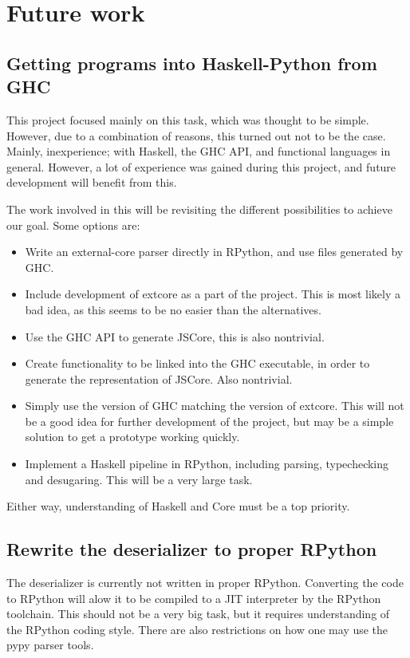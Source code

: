 \section{Future work}

\subsection{Getting programs into Haskell-Python from GHC}

This project focused mainly on this task, which was thought to be simple.
However, due to a combination of reasons, this turned out not to be the case.
Mainly, inexperience; with Haskell, the GHC API, and functional languages in 
general. However, a lot of experience was gained during this project, and
future development will benefit from this.

The work involved in this will be revisiting the different possibilities to
achieve our goal. Some options are:

\begin{itemize}
\item Write an external-core parser directly in RPython, and use files generated by GHC.
\item Include development of extcore as a part of the project. This is most likely a bad
idea, as this seems to be no easier than the alternatives.
\item Use the GHC API to generate JSCore, this is also nontrivial.
\item Create functionality to be linked into the GHC executable, in order to generate the
representation of JSCore. Also nontrivial.
\item Simply use the version of GHC matching the version of extcore. This will not be
a good idea for further development of the project, but may be a simple solution to get
a prototype working quickly.
\item Implement a Haskell pipeline in RPython, including parsing, typechecking and desugaring.
This will be a very large task.
\end{itemize}

Either way, understanding of Haskell and Core must be a top priority.

\subsection{Rewrite the deserializer to proper RPython}

The deserializer is currently not written in proper RPython. 
Converting the code to RPython will alow it to be compiled to a JIT interpreter by
the RPython toolchain. This should not be a very big task, but it requires understanding
of the RPython coding style. There are also restrictions on how one may use the pypy parser
tools.

